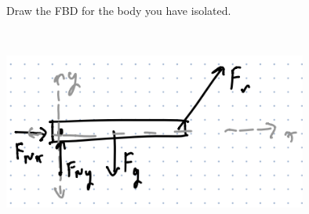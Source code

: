 Draw the FBD for the body you have isolated.

\begin{solution}\
    \begin{center}
        \includegraphics[width=0.75\textwidth]{img/e4p2.png}
    \end{center}
\end{solution}